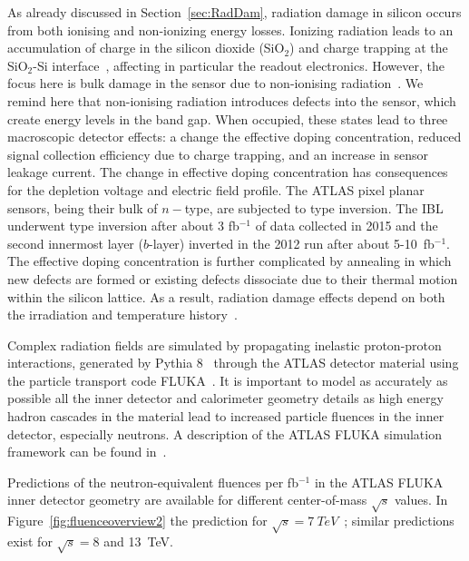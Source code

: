 As already discussed in Section~\ref{sec:RadDam}, 
radiation damage in silicon occurs from both ionising and 
non-ionizing energy losses. Ionizing radiation leads to an accumulation of charge in the silicon dioxide 
(SiO$_2$) and charge trapping at the SiO$_2$-Si interface~\cite{Oldham}, affecting in particular the 
readout electronics. However, the focus here is bulk damage in the sensor due to non-ionising 
radiation~\cite{moll-thesis}.   We remind here that non-ionising radiation introduces defects into the sensor, which create 
energy levels in the band gap.  When occupied, these states lead to three macroscopic detector effects: 
a change the effective doping concentration, reduced signal collection efficiency due to charge trapping, 
and an increase in sensor leakage current. The change in effective doping concentration has 
consequences for the depletion voltage and electric field profile. The ATLAS pixel planar sensors, 
being their bulk of $n-$type, are subjected to type inversion. The IBL underwent type inversion after about 3 fb$^{-1}$ of data 
collected in 2015 and the second innermost layer ($b$-layer) inverted in the 2012 run after about 
5-10~fb$^{-1}$. The effective doping concentration is further complicated by annealing in which new 
defects are formed or existing defects dissociate due to their thermal motion within the silicon lattice. As 
a result, radiation damage effects depend on both the irradiation and temperature 
history~\cite{moll-thesis}. 

 Complex radiation fields are simulated by 
propagating inelastic proton-proton interactions, generated by 
Pythia 8~\cite{Sjostrand:2006za,Sjostrand:2014zea}  through the ATLAS detector 
material using the particle transport code FLUKA~\cite{Battistoni:2007zzb,Ferrari:898301}. It is 
important to model as accurately as possible all the inner detector and calorimeter geometry details as 
high energy hadron cascades in the material lead to increased particle fluences in the inner detector, 
especially neutrons. A description of the ATLAS FLUKA simulation framework can be found 
in~\cite{Baranov:814823}.

Predictions of the  neutron-equivalent fluences per fb$^{-1}$ in the ATLAS FLUKA inner detector 
geometry are available for different center-of-mass $\sqrt{s}$ values. 
In Figure~\ref{fig:fluenceoverview2} the prediction  for $\sqrt{s}=7~TeV$~\cite{Aad:2014mta}; 
similar predictions exist for $\sqrt{s}=8$ and 13~TeV.

